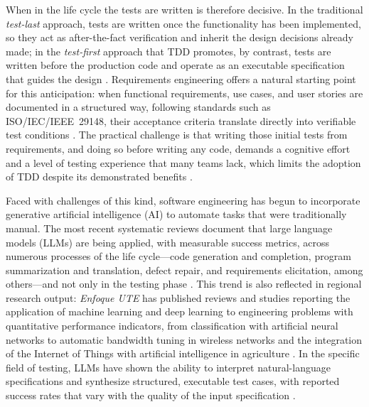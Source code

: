\documentclass[10pt,journal,twoside,letterpaper]{IEEEtran}
\begin{document}
    When in the life cycle the tests are written is therefore decisive. In the traditional \emph{test-last} approach, tests are written once the functionality has been implemented, so they act as after-the-fact verification and inherit the design decisions already made; in the \emph{test-first} approach that TDD promotes, by contrast, tests are written before the production code and operate as an executable specification that guides the design \cite{beck2003tdd,erdogmus2005testfirst}. Requirements engineering offers a natural starting point for this anticipation: when functional requirements, use cases, and user stories are documented in a structured way, following standards such as ISO/IEC/IEEE~29148, their acceptance criteria translate directly into verifiable test conditions \cite{iso29148}. The practical challenge is that writing those initial tests from requirements, and doing so before writing any code, demands a cognitive effort and a level of testing experience that many teams lack, which limits the adoption of TDD despite its demonstrated benefits \cite{ghafari2020inconclusive}.
    
    Faced with challenges of this kind, software engineering has begun to incorporate generative artificial intelligence (AI) to automate tasks that were traditionally manual. The most recent systematic reviews document that large language models (LLMs) are being applied, with measurable success metrics, across numerous processes of the life cycle---code generation and completion, program summarization and translation, defect repair, and requirements elicitation, among others---and not only in the testing phase \cite{hou2024llm4se,carleton2024genai}. This trend is also reflected in regional research output: \emph{Enfoque UTE} has published reviews and studies reporting the application of machine learning and deep learning to engineering problems with quantitative performance indicators, from classification with artificial neural networks \cite{molina2024ann} to automatic bandwidth tuning in wireless networks \cite{carrillo2025ai} and the integration of the Internet of Things with artificial intelligence in agriculture \cite{basurto2026iotai}. In the specific field of testing, LLMs have shown the ability to interpret natural-language specifications and synthesize structured, executable test cases, with reported success rates that vary with the quality of the input specification \cite{wang2024survey,yang2024evaluation,rehan2025harnessing,bhatia2024unit,korraprolu2025testcase,takerngsaksiri2025pytester}.
    
\end{document}
